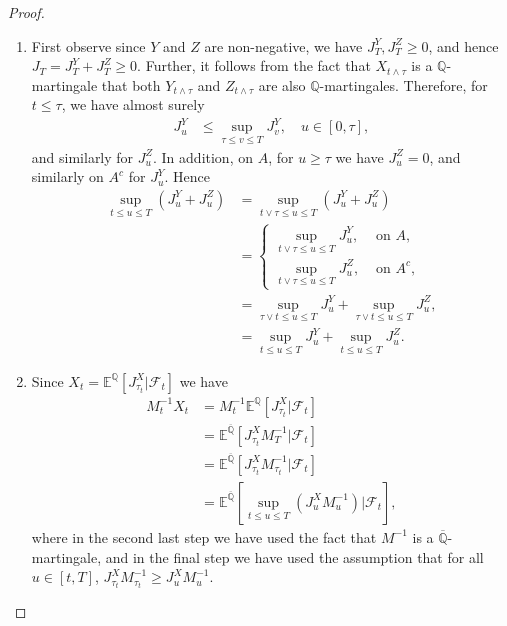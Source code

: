 \documentclass[a4paper]{amsart}
\theoremstyle{definition}
\theoremstyle{remark}
\numberwithin{equation}{section}
\newcommand{\E}{\mathbb{E}}
\newcommand{\Q}{\mathbb{Q}}
\newcommand{\Fc}{\mathcal{F}}
\newcommand{\Eq}[1]{\E^{\Q}\left[#1\right]}
\newcommand{\Ebq}[1]{\E^{\bQ}\left[#1\right]}
\newcommand{\ol}{\overline}
\newcommand{\bQ}{\ol{\mathbb{Q}}}
\begin{document}
\begin{proof}
\begin{enumerate}
  \item First observe since $Y$ and $Z$ are non-negative, we have $J_T^Y, J_T^Z \ge 0$, and hence $J_T = J_T^Y + J_T^Z \ge 0$. Further, it follows from the fact that $X_{t \wedge \tau}$ is a $\Q$-martingale that both $Y_{t \wedge \tau}$ and $Z_{t \wedge \tau}$ are also $\Q$-martingales. Therefore, for $t \le \tau$, we have almost surely
  \begin{align*}
    J_u^Y & \le \sup_{\tau \le v \le T} J_v^Y, \quad u \in [0,\tau],
  \end{align*} 
  and similarly for $J_u^Z$. In addition, on $A$, for $u \ge \tau$ we have $J_u^Z = 0$, and similarly on $A^c$ for $J_u^Y$. Hence
  \begin{align*}
    \sup_{t \le u \le T} (J_u^Y + J_u^Z) & = \sup_{t \vee \tau \le u \le T} (J_u^Y + J_u^Z) \\
    & =
    \begin{cases}
      \sup_{t \vee \tau \le u \le T} J_u^Y, & \text{ on } A, \\
      \sup_{t \vee \tau \le u \le T} J_u^Z, & \text{ on } A^c,
    \end{cases}
    \\
    & =
      \sup_{\tau \vee t \le u \le T} J_u^Y + \sup_{\tau \vee t \le u \le T} J_u^Z,\\
    & = \sup_{t \le u \le T} J_u^Y + \sup_{t \le u \le T} J_u^Z.
  \end{align*}  

  \item Since $X_t = \Eq{J_{\tau_t}^X | \Fc_t}$ we have 
  \begin{align*}
    M_t^{-1} X_t & = M_t^{-1} \Eq{J_{\tau_t}^X | \Fc_t} \\
    & = \Ebq{J_{\tau_t}^X M_{T}^{-1} | \Fc_t} \\
    & = \Ebq{J_{\tau_t}^X M_{\tau_t}^{-1} | \Fc_t}\\
    & = \Ebq{\sup_{t \le u \le T} (J_u^X M_u^{-1}) | \Fc_t},
  \end{align*}
  where in the second last step we have used the fact that $M^{-1}$ is
  a $\bQ$-martingale, and in the final step we have used the
  assumption that for all $u \in [t,T]$,
  $J_{\tau_t}^X M^{-1}_{\tau_t} \ge J_{u}^X M^{-1}_{u}$.
\end{enumerate}

\end{proof}
\end{document}
